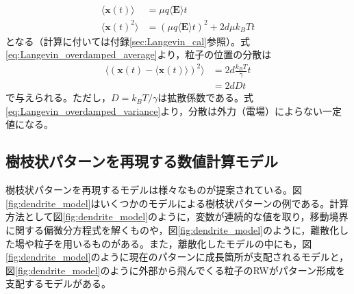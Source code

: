 \documentclass[autodetect-engine,dvi=dvipdfmx,a4paper,ja=standard,oneside,openany,11pt]{bxjsbook}
\begin{document}
\begin{equation}
  \begin{split}
    \langle\bm{x}(t)\rangle   & =\mu q\langle\bm{E}\rangle t                    \\
    \langle\bm{x}(t)^2\rangle & =(\mu q \langle\bm{E}\rangle t)^2+2d\mu k_B T t
  \end{split}
  \label{eq:Langevin_overdamped_average}
\end{equation}
となる（計算に付いては付録\ref{sec:Langevin_cal}参照）。式\eqref{eq:Langevin_overdamped_average}より，粒子の位置の分散は
\begin{equation}
  \begin{split}
    \langle(\bm{x}(t)-\langle\bm{x}(t)\rangle)^2\rangle & =2d \frac{k_B T}{\gamma} t \\
                                                        & =2dDt
  \end{split}
  \label{eq:Langevin_overdamped_variance}
\end{equation}
で与えられる。ただし，$D=k_B T/\gamma$は拡散係数である。式\eqref{eq:Langevin_overdamped_variance}より，分散は外力（電場）によらない一定値になる。

\subsection{樹枝状パターンを再現する数値計算モデル}
樹枝状パターンを再現するモデルは様々なものが提案されている。図\ref{fig:dendrite_model}はいくつかのモデルによる樹枝状パターンの例である。計算方法として図\ref{fig:dendrite_model}のように，変数が連続的な値を取り，移動境界に関する偏微分方程式を解くものや，図\ref{fig:dendrite_model}のように，離散化した場や粒子を用いるものがある。また，離散化したモデルの中にも，図\ref{fig:dendrite_model}のように現在のパターンに成長箇所が支配されるモデルと，図\ref{fig:dendrite_model}のように外部から飛んでくる粒子のRWがパターン形成を支配するモデルがある。
\end{document}
